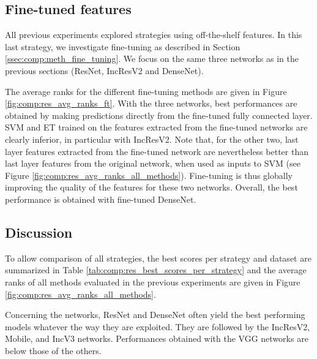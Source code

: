 \subsection{Fine-tuned features}
\label{ssec:comp:exp_fine_tuning}

All previous experiments explored strategies using off-the-shelf features. In this last strategy, we investigate fine-tuning as described in Section \ref{ssec:comp:meth_fine_tuning}. We focus on the same three networks as in the previous sections (ResNet, IncResV2 and DenseNet).

The average ranks for the different fine-tuning methods are given in Figure \ref{fig:comp:res_avg_ranks_ft}. With the three networks, best performances are obtained by making predictions directly from the fine-tuned fully connected layer. SVM and ET trained on the features extracted from the fine-tuned networks are clearly inferior, in particular with IncResV2. Note that, for the other two, last layer features extracted from the fine-tuned network are nevertheless better than last layer features from the original network, when used as inputs to SVM (see Figure \ref{fig:comp:res_avg_ranks_all_methods}). Fine-tuning is thus globally improving the quality of the features for these two networks. Overall, the best performance is obtained with fine-tuned DenseNet.



\subsection{Discussion}
\label{ssec:comp:exp_comparing}



To allow comparison of all strategies, the best scores per strategy and dataset are summarized in Table \ref{tab:comp:res_best_scores_per_strategy} and the average ranks of all methods evaluated in the previous experiments are given in Figure \ref{fig:comp:res_avg_ranks_all_methods}.

Concerning the networks, ResNet and DenseNet often yield the best performing models whatever the way they are exploited. They are followed by the IncResV2, Mobile, and IncV3 networks. Performances obtained with the VGG networks are below those of the others.

